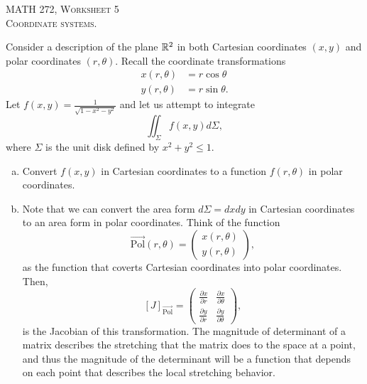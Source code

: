 \documentclass[12pt]{article} %
\begin{document}
\begin{center}
   \textsc{\large MATH 272, Worksheet 5}\\
   \textsc{Coordinate systems.}
\end{center}
\vspace{.5cm}

\begin{problem}
    Consider a description of the plane $\mathbb{R}^2$ in both Cartesian coordinates $(x,y)$ and polar coordinates $(r,\theta)$.  Recall the coordinate transformations
    \begin{align*}
        x(r,\theta)&= r\cos \theta\\
        y(r,\theta)&= r\sin \theta.
    \end{align*}
    Let $f(x,y) = \frac{1}{\sqrt{1-x^2-y^2}}$ and let us attempt to integrate
    \[
    \iint_{\Sigma} f(x,y)d\Sigma,
    \]
    where $\Sigma$ is the unit disk defined by $x^2+y^2\leq 1$.
    \begin{enumerate}[(a)]
        \item Convert $f(x,y)$ in Cartesian coordinates to a function $f(r,\theta)$ in polar coordinates.
        \item Note that we can convert the area form $d\Sigma=dxdy$ in Cartesian coordinates to an area form in polar coordinates.  Think of the function
        \[
        \vec{\textrm{Pol}}(r,\theta) = \begin{pmatrix} x(r,\theta) \\ y(r,\theta) \end{pmatrix},
        \]
        as the function that coverts Cartesian coordinates into polar coordinates.  Then, 
        \[
        [J]_{\vec{\textrm{Pol}}} = \begin{pmatrix} \frac{\partial x}{\partial r} & \frac{\partial x}{\partial \theta} \\ \frac{\partial y}{\partial r} & \frac{\partial y}{\partial \theta} \end{pmatrix},
        \]
        is the Jacobian of this transformation. The magnitude of determinant of a matrix describes the stretching that the matrix does to the space at a point, and thus the magnitude of the determinant will be a function that depends on each point that describes the local stretching behavior.
        

\end{enumerate}
\end{problem}
\end{document}
